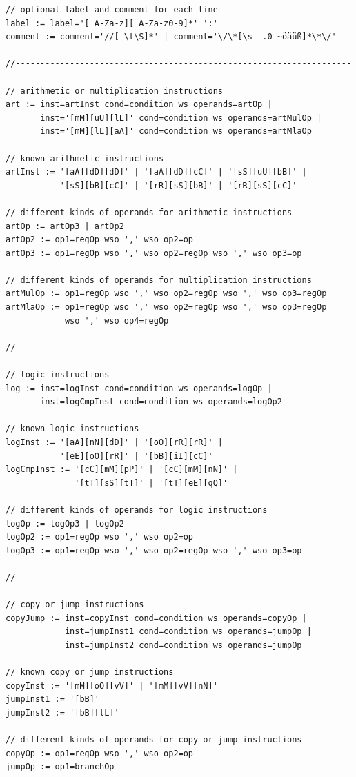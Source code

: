 \documentclass[a4paper, 11pt, onecolumn]{article}
\begin{document}
\begin{lstlisting}[basicstyle=\ttfamily\footnotesize]
// optional label and comment for each line
label := label='[_A-Za-z][_A-Za-z0-9]*' ':'
comment := comment='//[ \t\S]*' | comment='\/\*[\s -.0-~öäüß]*\*\/'

//--------------------------------------------------------------------

// arithmetic or multiplication instructions
art := inst=artInst cond=condition ws operands=artOp |
       inst='[mM][uU][lL]' cond=condition ws operands=artMulOp |
       inst='[mM][lL][aA]' cond=condition ws operands=artMlaOp

// known arithmetic instructions
artInst := '[aA][dD][dD]' | '[aA][dD][cC]' | '[sS][uU][bB]' |
           '[sS][bB][cC]' | '[rR][sS][bB]' | '[rR][sS][cC]'

// different kinds of operands for arithmetic instructions
artOp := artOp3 | artOp2
artOp2 := op1=regOp wso ',' wso op2=op
artOp3 := op1=regOp wso ',' wso op2=regOp wso ',' wso op3=op

// different kinds of operands for multiplication instructions
artMulOp := op1=regOp wso ',' wso op2=regOp wso ',' wso op3=regOp
artMlaOp := op1=regOp wso ',' wso op2=regOp wso ',' wso op3=regOp
            wso ',' wso op4=regOp

//--------------------------------------------------------------------

// logic instructions
log := inst=logInst cond=condition ws operands=logOp |
       inst=logCmpInst cond=condition ws operands=logOp2

// known logic instructions
logInst := '[aA][nN][dD]' | '[oO][rR][rR]' |
           '[eE][oO][rR]' | '[bB][iI][cC]'
logCmpInst := '[cC][mM][pP]' | '[cC][mM][nN]' |
              '[tT][sS][tT]' | '[tT][eE][qQ]'

// different kinds of operands for logic instructions
logOp := logOp3 | logOp2
logOp2 := op1=regOp wso ',' wso op2=op
logOp3 := op1=regOp wso ',' wso op2=regOp wso ',' wso op3=op

//--------------------------------------------------------------------

// copy or jump instructions
copyJump := inst=copyInst cond=condition ws operands=copyOp |
            inst=jumpInst1 cond=condition ws operands=jumpOp |
            inst=jumpInst2 cond=condition ws operands=jumpOp

// known copy or jump instructions
copyInst := '[mM][oO][vV]' | '[mM][vV][nN]'
jumpInst1 := '[bB]'
jumpInst2 := '[bB][lL]'

// different kinds of operands for copy or jump instructions
copyOp := op1=regOp wso ',' wso op2=op
jumpOp := op1=branchOp


\end{lstlisting}
\end{document}
